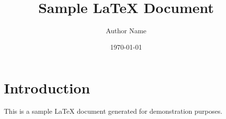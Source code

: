 \documentclass{article}
\title{Sample LaTeX Document}
\author{Author Name}
\date{\today}
\begin{document}
    \maketitle

    \section{Introduction}

    This is a sample LaTeX document generated for demonstration purposes.

    
\end{document}

